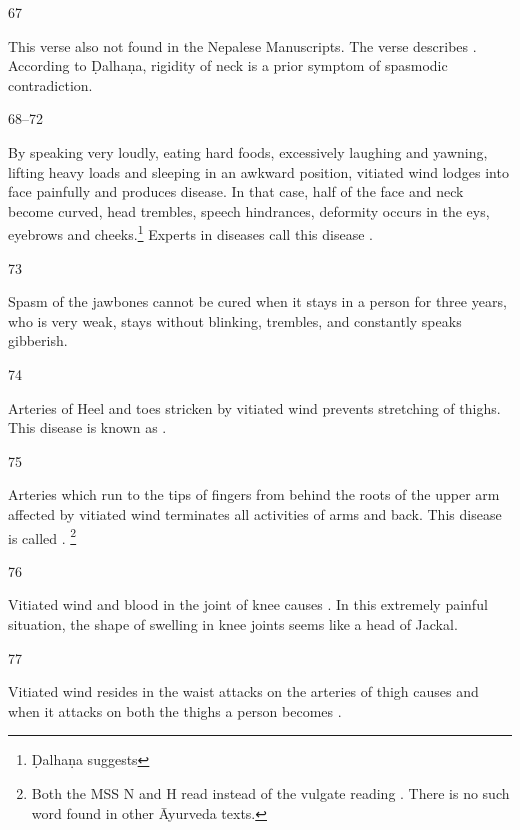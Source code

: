 \begin{translation}
{\item[67]

	This verse also not found in the Nepalese Manuscripts. The verse
	describes . According to Ḍalhaṇa,
	rigidity of neck is a prior symptom of spasmodic contradiction. 

\item[68--72]

	By speaking very loudly, eating hard foods, excessively laughing and
	yawning, lifting heavy loads and sleeping in an awkward position,
	vitiated wind lodges into face painfully and produces
	 disease. In that case, half of
	the face and neck become curved, head trembles, speech hindrances,
	deformity occurs in the eys, eyebrows and cheeks.\footnote{Ḍalhaṇa
	suggests } Experts in
	diseases call this disease . 

\item[73]

	Spasm of the jawbones cannot be cured when it stays in a person for
	three years, who is very weak, stays without blinking, trembles, and
	constantly speaks gibberish.

\item[74]

	Arteries of Heel and toes stricken by vitiated wind prevents stretching
	of thighs. This disease is known as .

\item[75]

	Arteries which run to the tips of fingers from behind the roots of the
	upper arm affected by vitiated wind terminates all activities of arms
	and back.  This disease is called . \footnote{Both the MSS N and H read  instead of the
	vulgate reading . There is no such word found in other
	Āyurveda texts.}

\item[76]

	Vitiated wind and blood in the joint of knee causes
	. In this extremely painful
	situation, the shape of swelling in knee joints seems like a head of
	Jackal. 

\item[77]

	Vitiated wind resides in the waist attacks on the arteries of thigh
	causes  and when it attacks on both the thighs a
	person becomes .

}
\end{translation}
